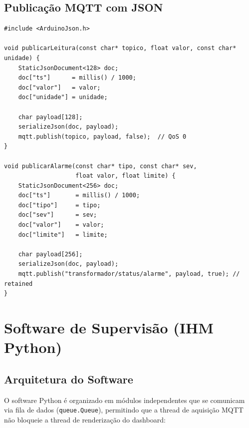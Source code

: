 \documentclass[12pt, a4paper]{article}
\begin{document}
\subsection{Publicação MQTT com JSON}

\begin{lstlisting}[style=cpp, caption={Serialização JSON e publicação MQTT}]
#include <ArduinoJson.h>

void publicarLeitura(const char* topico, float valor, const char* unidade) {
    StaticJsonDocument<128> doc;
    doc["ts"]      = millis() / 1000;
    doc["valor"]   = valor;
    doc["unidade"] = unidade;

    char payload[128];
    serializeJson(doc, payload);
    mqtt.publish(topico, payload, false);  // QoS 0
}

void publicarAlarme(const char* tipo, const char* sev,
                    float valor, float limite) {
    StaticJsonDocument<256> doc;
    doc["ts"]       = millis() / 1000;
    doc["tipo"]     = tipo;
    doc["sev"]      = sev;
    doc["valor"]    = valor;
    doc["limite"]   = limite;

    char payload[256];
    serializeJson(doc, payload);
    mqtt.publish("transformador/status/alarme", payload, true); // retained
}
\end{lstlisting}

\section{Software de Supervisão (IHM Python)}

\subsection{Arquitetura do Software}

O software Python é organizado em módulos independentes que se comunicam via fila de dados (\texttt{queue.Queue}), permitindo que a thread de aquisição MQTT não bloqueie a thread de renderização do dashboard:
\end{document}
